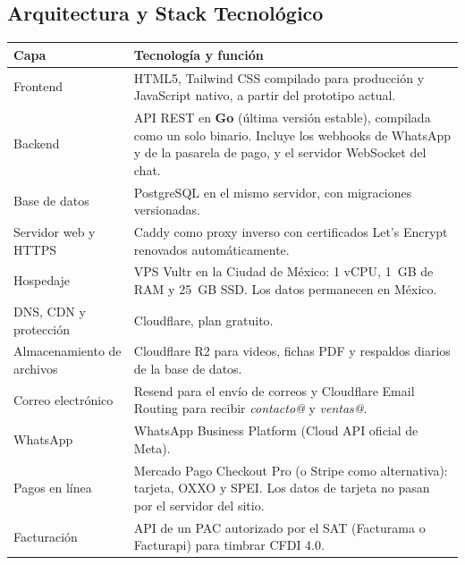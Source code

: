 \documentclass[11pt,letterpaper]{article}
\begin{document}
\subsection{Arquitectura y Stack Tecnológico}
\renewcommand{\arraystretch}{1.3}
\begin{longtable}{@{} >{\raggedright\arraybackslash}p{3.6cm} >{\raggedright\arraybackslash}p{12.2cm} @{}}
\toprule
\textbf{Capa} & \textbf{Tecnología y función} \\
\midrule
\endhead
\bottomrule
\endfoot
Frontend & HTML5, Tailwind CSS compilado para producción y JavaScript nativo, a partir del prototipo actual. \\
Backend & API REST en \textbf{Go} (última versión estable), compilada como un solo binario. Incluye los webhooks de WhatsApp y de la pasarela de pago, y el servidor WebSocket del chat. \\
Base de datos & PostgreSQL en el mismo servidor, con migraciones versionadas. \\
Servidor web y HTTPS & Caddy como proxy inverso con certificados Let's Encrypt renovados automáticamente. \\
Hospedaje & VPS Vultr en la Ciudad de México: 1 vCPU, 1~GB de RAM y 25~GB SSD. Los datos permanecen en México. \\
DNS, CDN y protección & Cloudflare, plan gratuito. \\
Almacenamiento de archivos & Cloudflare R2 para videos, fichas PDF y respaldos diarios de la base de datos. \\
Correo electrónico & Resend para el envío de correos y Cloudflare Email Routing para recibir \textit{contacto@} y \textit{ventas@}. \\
WhatsApp & WhatsApp Business Platform (Cloud API oficial de Meta). \\
Pagos en línea & Mercado Pago Checkout Pro (o Stripe como alternativa): tarjeta, OXXO y SPEI. Los datos de tarjeta no pasan por el servidor del sitio. \\
Facturación & API de un PAC autorizado por el SAT (Facturama o Facturapi) para timbrar CFDI 4.0. \\
\end{longtable}
\end{document}
